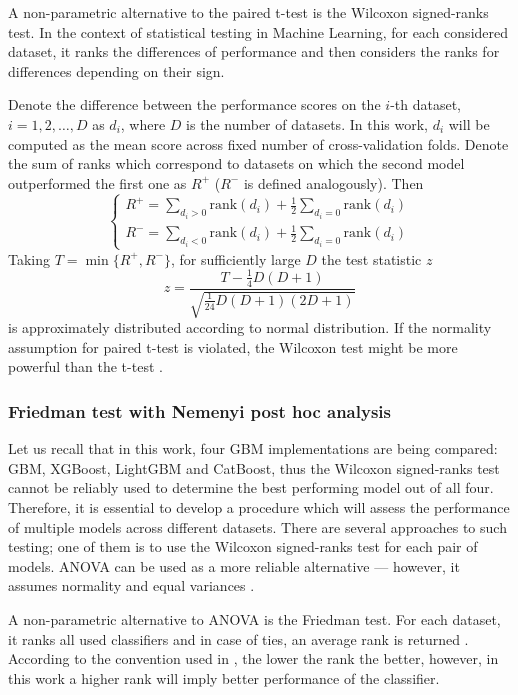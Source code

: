 \documentclass[magisterska, english]{pwr_wmat_praca_dyplomowa}
\theoremstyle{plain}
\numberwithin{theorem}{chapter}
\theoremstyle{definition}
\numberwithin{theorem}{chapter}
\begin{document}
A non-parametric alternative to the paired t-test is the Wilcoxon signed-ranks test. In the context of statistical testing in Machine Learning, for each considered dataset, it ranks the differences of performance and then considers the ranks for differences depending on their sign.

Denote the difference between the performance scores on the $i$-th dataset, $i=1,2,\ldots, D$ as $d_i$, where $D$ is the number of datasets. In this work, $d_i$ will be computed as the mean score across fixed number of cross-validation folds. Denote the sum of ranks which correspond to datasets on which the second model outperformed the first one as $R^+$ ($R^-$ is defined analogously). Then \cite{demsar}
\begin{equation}
\begin{cases}
    \displaystyle R^+ = \sum_{d_i>0}\mathrm{rank}(d_i) + \frac12\sum_{d_i=0}\mathrm{rank}(d_i)\\
    \displaystyle R^- = \sum_{d_i<0}\mathrm{rank}(d_i) + \frac12\sum_{d_i=0}\mathrm{rank}(d_i)
\end{cases}
\end{equation}
Taking $T=\min\{R^+, R^-\}$, for sufficiently large $D$  the test statistic $z$ \cite{demsar}
\begin{equation}
z = \frac{T-\frac 14 D(D+1)}{\sqrt{\frac{1}{24}D(D+1)(2D+1)}}
\end{equation}
is approximately distributed according to normal distribution. If the normality assumption for paired t-test is violated, the Wilcoxon test might be more powerful than the t-test \cite{demsar}.

\subsubsection{Friedman test with Nemenyi post hoc analysis}
Let us recall that in this work, four GBM implementations are being compared: GBM, XGBoost, LightGBM and CatBoost, thus the Wilcoxon signed-ranks test cannot be reliably used to determine the best performing model out of all four. Therefore, it is essential to develop a procedure which will assess the performance of multiple models across different datasets. There are several approaches to such testing; one of them is to use the Wilcoxon signed-ranks test for each pair of models. ANOVA can be used as a more reliable alternative --- however, it assumes normality and equal variances \cite{demsar}.

A non-parametric alternative to ANOVA is the Friedman test. For each dataset, it ranks all used classifiers and in case of ties, an average rank is returned \cite{demsar}. According to the convention used in \cite{demsar}, the lower the rank the better, however, in this work a higher rank will imply better performance of the classifier.
\end{document}

